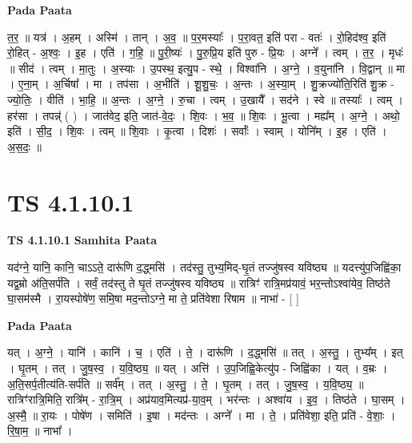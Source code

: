 \documentclass[17pt]{extarticle}
\begin{document}
\textbf{Pada Paata} \newline

त॒र॒ ॥ यत्र॑ । अ॒हम् । अस्मि॑ । तान् । अ॒व॒ ॥ प॒र॒मस्याः᳚ । प॒रा॒वत॒ इति॑ परा - वतः॑ । रो॒हिद॑श्व॒ इति॑ रो॒हित् - अ॒श्वः॒ । इ॒ह । एति॑ । ग॒हि॒ ॥ पु॒री॒ष्यः॑ । पु॒रु॒प्रि॒य इति॑ पुरु - प्रि॒यः । अग्ने᳚ । त्वम् । त॒र॒ । मृधः॑ ॥ सीद॑ । त्वम् । मा॒तुः । अ॒स्याः । उ॒पस्थ॒ इत्यु॒प - स्थे॒ । विश्वा॑नि । अ॒ग्ने॒ । व॒युना॑नि । वि॒द्वान् ॥ मा । ए॒ना॒म् । अ॒र्चिषा᳚ । मा । तप॑सा । अ॒भीति॑ । शू॒शु॒चः॒ । अ॒न्तः । अ॒स्या॒म् । शु॒क्रज्यो॑ति॒रिति॑ शु॒क्र - ज्यो॒तिः॒ । वीति॑ । भा॒हि॒ ॥ अ॒न्तः । अ॒ग्ने॒ । रु॒चा । त्वम् । उ॒खायै᳚ । सद॑ने । स्वे ॥ तस्याः᳚ । त्वम् । हर॑सा । तपन्न्॑ ( ) । जात॑वेद॒ इति॒ जात॑-वे॒दः॒ । शि॒वः । भ॒व॒ ॥ शि॒वः । भू॒त्वा । मह्य᳚म् । अ॒ग्ने॒ । अथो॒ इति॑ । सी॒द॒ । शि॒वः । त्वम् ॥ शि॒वाः । कृ॒त्वा । दिशः॑ । सर्वाः᳚ । स्वाम् । योनि᳚म् । इ॒ह । एति॑ । अ॒स॒दः॒ ॥  \newline





\section{ TS 4.1.10.1 }

\textbf{TS 4.1.10.1 } \newline
\textbf{Samhita Paata} \newline

यद॑ग्ने॒ यानि॒ कानि॒ चाऽऽते॒ दारू॑णि द॒द्ध्मसि॑ । तद॑स्तु॒ तुभ्य॒मिद्-घृ॒तं तज्जु॑षस्व यविष्ठ्य ॥ यदत्त्यु॑प॒जिह्वि॑का॒ यद्व॒म्रो अ॑ति॒सर्प॑ति । सर्वं॒ तद॑स्तु ते घृ॒तं तज्जु॑षस्व यविष्ठ्य ॥ रात्रिꣳ॑ रात्रि॒मप्र॑यावं॒ भर॒न्तोऽश्वा॑येव॒ तिष्ठ॑ते घा॒सम॑स्मै । रा॒यस्पोषे॑ण॒ समि॒षा मद॒न्तोऽग्ने॒ मा ते॒ प्रति॑वेशा रिषाम ॥ नाभा॑ - [  ] \newline

\textbf{Pada Paata} \newline

यत् । अ॒ग्ने॒ । यानि॑ । कानि॑ । च॒ । एति॑ । ते॒ । दारू॑णि । द॒द्ध्मसि॑ ॥ तत् । अ॒स्तु॒ । तुभ्य᳚म् । इत् । घृ॒तम् । तत् । जु॒ष॒स्व॒ । य॒वि॒ष्ठ्य॒ ॥ यत् । अत्ति॑ । उ॒प॒जिह्वि॒केत्यु॑प - जिह्वि॑का । यत् । व॒म्रः । अ॒ति॒सर्प॒तीत्य॑ति-सर्प॑ति ॥ सर्व᳚म् । तत् । अ॒स्तु॒ । ते॒ । घृ॒तम् । तत् । जु॒ष॒स्व॒ । य॒वि॒ष्ठ्य॒ ॥ रात्रिꣳ॑रात्रि॒मिति॒ रात्रि᳚म् - रा॒त्रि॒म् । अप्र॑याव॒मित्यप्र॑-या॒व॒म् । भर॑न्तः । अश्वा॑य । इ॒व॒ । तिष्ठ॑ते । घा॒सम् । अ॒स्मै॒ ॥ रा॒यः । पोषे॑ण । समिति॑ । इ॒षा । मद॑न्तः । अग्ने᳚ । मा । ते॒ । प्रति॑वेशा॒ इति॒ प्रति॑ - वे॒शाः॒ । रि॒षा॒म॒ ॥ नाभा᳚ ।  \newline
\end{document}
